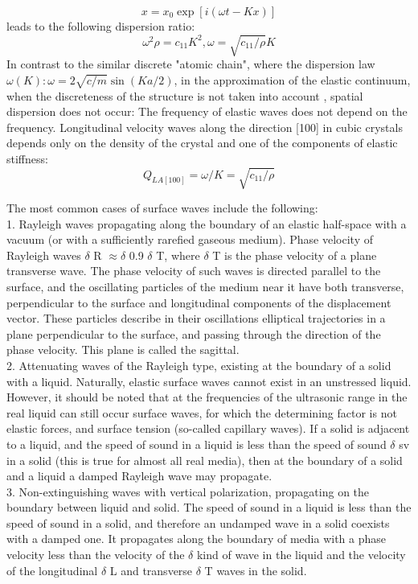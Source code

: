 \documentclass[a4paper,14pt]{extreport}
\begin{document}
$$
x=x_{0} \exp [i(\omega t-K x)]
$$
leads to the following dispersion ratio:
$$
\omega^{2} \rho=c_{11} K^{2}, \omega=\sqrt{c_{11} / \rho} K
$$
In contrast to the similar discrete "atomic chain", where the dispersion law $ \omega (K): \omega = 2 \sqrt {c / m} \sin (Ka / 2) $, in the approximation of the elastic continuum, when the discreteness of the structure is not taken into account , spatial dispersion does not occur:
The frequency of elastic waves does not depend on the frequency. Longitudinal velocity
waves along the direction [100] in cubic crystals depends only on the density of the crystal and one of the components of elastic stiffness:
$$
Q_{L A[100]}=\omega / K=\sqrt{c_{11} / \rho}
$$

The most common cases of surface waves include the following: \\

1. Rayleigh waves propagating along the boundary of an elastic half-space with a vacuum (or with a sufficiently rarefied gaseous medium). Phase velocity of Rayleigh waves $ \delta $ R $ \approx \delta $ 0.9 $ \delta $ T, where $ \delta $ T is the phase velocity of a plane transverse wave. The phase velocity of such waves is directed parallel to the surface, and the oscillating particles of the medium near it have both transverse, perpendicular to the surface and longitudinal components of the displacement vector. These particles describe in their oscillations elliptical trajectories in a plane perpendicular to the surface, and passing through the direction of the phase velocity. This plane is called the sagittal. \\

2. Attenuating waves of the Rayleigh type, existing at the boundary of a solid with a liquid. Naturally, elastic surface waves cannot exist in an unstressed liquid. However, it should be noted that at the frequencies of the ultrasonic range in the real liquid can still occur surface waves, for which the determining factor is not elastic forces, and surface tension (so-called capillary waves). If a solid is adjacent to a liquid, and the speed of sound in a liquid is less than the speed of sound $ \delta $ sv in a solid (this is true for almost all real media), then at the boundary of a solid and a liquid a damped Rayleigh wave may propagate. \\

3. Non-extinguishing waves with vertical polarization, propagating on the boundary between liquid and solid. The speed of sound in a liquid is less than the speed of sound in a solid, and therefore an undamped wave in a solid coexists with a damped one. It propagates along the boundary of media with a phase velocity less than the velocity of the $ \delta $ kind of wave in the liquid and the velocity of the longitudinal $ \delta $ L and transverse $ \delta $ T waves in the solid.
\end{document}
